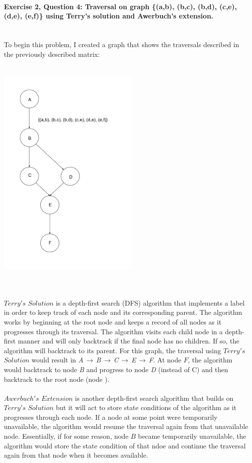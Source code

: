 \documentclass{article}
\begin{document}
\\ \\ \\
\textbf{Exercise 2, Question 4: Traversal on graph \{(a,b), (b,c), (b,d), (c,e), (d,e), (e,f)\} using Terry's solution and Awerbuch's extension.}
\\ \\ \\
To begin this problem, I created a graph that shows the traversals described in the previously described matrix: \\\\
\centerline{\includegraphics[width=70mm,scale=0.7]{graph.png}} \\ \\
$Terry's$ $Solution$ is a depth-first search (DFS) algorithm that implements a label in order to keep track of each node and its corresponding parent. The algorithm works by beginning at the root node and keeps a record of all nodes as it progresses through its traversal. The algorithm visits each child node in a depth-first manner and will only backtrack if the final node has no children. If so, the algorithm will backtrack to its parent. For this graph, the traversal using $Terry's$ $Solution$ would result in \textit{A}$\,\to\,$\textit{B}$\,\to\,$\textit{C}$\,\to\,$\textit{E}$\,\to\,$\textit{F}. At node $F$, the algorithm would backtrack to node \textit{B} and progress to node \textit{D} (instead of C) and then backtrack to the root node (node ).\\ \\
$Awerbuch's$ $Extension$ is another depth-first search algorithm that builds on $Terry's$ $Solution$ but it will act to store state conditions of the algorithm as it progresses through each node. If a node at some point were temporarily unavailable, the algorithm would resume the traversal again from that unavailable node. Essentially, if for some reason, node $B$ became temporarily unavailable, the algorithm would store the state condition of that ndoe and continue the traversal again from that node when it becomes available. 
\end{document}
